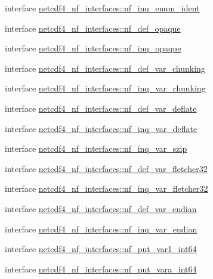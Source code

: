 \begin{DoxyCompactItemize}
interface \hyperlink{interfacenetcdf4__nf__interfaces_1_1nf__inq__enum__ident}{netcdf4\+\_\+nf\+\_\+interfaces\+::nf\+\_\+inq\+\_\+enum\+\_\+ident}
\item 
interface \hyperlink{interfacenetcdf4__nf__interfaces_1_1nf__def__opaque}{netcdf4\+\_\+nf\+\_\+interfaces\+::nf\+\_\+def\+\_\+opaque}
\item 
interface \hyperlink{interfacenetcdf4__nf__interfaces_1_1nf__inq__opaque}{netcdf4\+\_\+nf\+\_\+interfaces\+::nf\+\_\+inq\+\_\+opaque}
\item 
interface \hyperlink{interfacenetcdf4__nf__interfaces_1_1nf__def__var__chunking}{netcdf4\+\_\+nf\+\_\+interfaces\+::nf\+\_\+def\+\_\+var\+\_\+chunking}
\item 
interface \hyperlink{interfacenetcdf4__nf__interfaces_1_1nf__inq__var__chunking}{netcdf4\+\_\+nf\+\_\+interfaces\+::nf\+\_\+inq\+\_\+var\+\_\+chunking}
\item 
interface \hyperlink{interfacenetcdf4__nf__interfaces_1_1nf__def__var__deflate}{netcdf4\+\_\+nf\+\_\+interfaces\+::nf\+\_\+def\+\_\+var\+\_\+deflate}
\item 
interface \hyperlink{interfacenetcdf4__nf__interfaces_1_1nf__inq__var__deflate}{netcdf4\+\_\+nf\+\_\+interfaces\+::nf\+\_\+inq\+\_\+var\+\_\+deflate}
\item 
interface \hyperlink{interfacenetcdf4__nf__interfaces_1_1nf__inq__var__szip}{netcdf4\+\_\+nf\+\_\+interfaces\+::nf\+\_\+inq\+\_\+var\+\_\+szip}
\item 
interface \hyperlink{interfacenetcdf4__nf__interfaces_1_1nf__def__var__fletcher32}{netcdf4\+\_\+nf\+\_\+interfaces\+::nf\+\_\+def\+\_\+var\+\_\+fletcher32}
\item 
interface \hyperlink{interfacenetcdf4__nf__interfaces_1_1nf__inq__var__fletcher32}{netcdf4\+\_\+nf\+\_\+interfaces\+::nf\+\_\+inq\+\_\+var\+\_\+fletcher32}
\item 
interface \hyperlink{interfacenetcdf4__nf__interfaces_1_1nf__def__var__endian}{netcdf4\+\_\+nf\+\_\+interfaces\+::nf\+\_\+def\+\_\+var\+\_\+endian}
\item 
interface \hyperlink{interfacenetcdf4__nf__interfaces_1_1nf__inq__var__endian}{netcdf4\+\_\+nf\+\_\+interfaces\+::nf\+\_\+inq\+\_\+var\+\_\+endian}
\item 
interface \hyperlink{interfacenetcdf4__nf__interfaces_1_1nf__put__var1__int64}{netcdf4\+\_\+nf\+\_\+interfaces\+::nf\+\_\+put\+\_\+var1\+\_\+int64}
\item 
interface \hyperlink{interfacenetcdf4__nf__interfaces_1_1nf__put__vara__int64}{netcdf4\+\_\+nf\+\_\+interfaces\+::nf\+\_\+put\+\_\+vara\+\_\+int64}

\end{DoxyCompactItemize}
